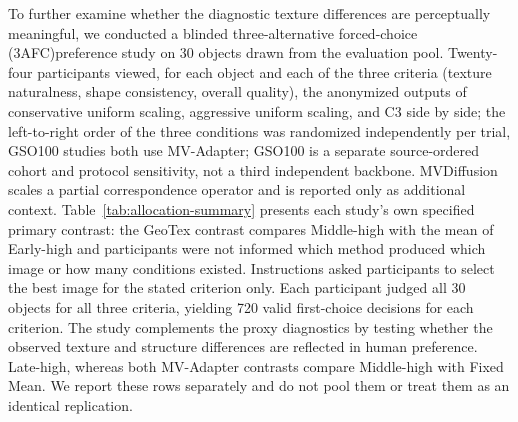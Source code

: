 \documentclass[times,twocolumn,final]{elsarticle}
\providecommand{\DIFadd}[1]{{\protect\color{blue} \sf #1}} %
\providecommand{\DIFdel}[1]{{\protect\color{red} \scriptsize #1}} %
\providecommand{\DIFaddbegin}{} %
\providecommand{\DIFaddend}{} %
\providecommand{\DIFdelbegin}{} %
\providecommand{\DIFdelend}{} %
\begin{document}
\DIFdel{To further examine whether the diagnostic texture differences are perceptually meaningful, we conducted a blinded three-alternative forced-choice (3AFC)preference study on 30 objects drawn from the evaluation pool.
Twenty-four participants viewed, for each object and each of the three criteria (texture naturalness, shape consistency, overall quality), the anonymized outputs of conservative uniform scaling, aggressive uniform scaling, }\DIFdelend and \DIFdelbegin \DIFdel{C3 side by side; the left-to-right order of the three conditions was randomized independently per trial, }\DIFdelend \DIFaddbegin \DIFadd{GSO100 studies both use MV-Adapter; GSO100 is a separate source-ordered cohort and protocol sensitivity, not a third independent backbone. MVDiffusion scales a partial correspondence operator and is reported only as additional context. Table~\ref{tab:allocation-summary} presents each study's own specified primary contrast: the GeoTex contrast compares Middle-high with the mean of Early-high }\DIFaddend and \DIFdelbegin \DIFdel{participants were not informed which method produced which image or how many conditions existed. Instructions asked participants to select the best image for the stated criterion only. Each participant judged all 30 objects for all three criteria, yielding 720 valid first-choice decisions for each criterion. The study complements the proxy diagnostics by testing whether the observed texture and structure differences are reflected in human preference.
}\DIFdelend \DIFaddbegin \DIFadd{Late-high, whereas both MV-Adapter contrasts compare Middle-high with Fixed Mean. We report these rows separately and do not pool them or treat them as an identical replication.
}\DIFaddend
\end{document}
